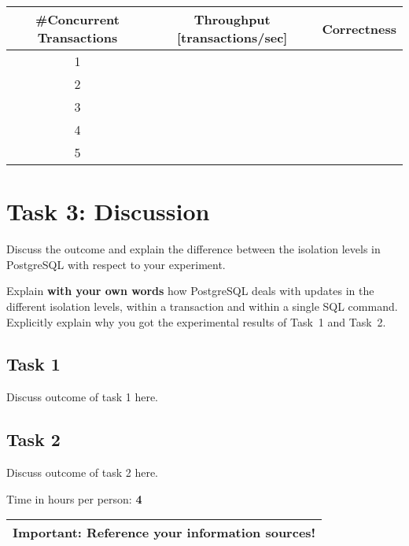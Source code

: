 \documentclass[11pt]{scrartcl}
\begin{document}
\bigskip

\begin{tabular}{c|c|c}
  \#Concurrent Transactions & Throughput [transactions/sec] & Correctness
  \\\hline
  1 & & \\
  2 & & \\
  3 & & \\
  4 & & \\
  5 & & \\    
\end{tabular}

\medskip

\section*{Task 3: Discussion}

Discuss the outcome and explain the difference between the isolation
levels in PostgreSQL with respect to your experiment.

Explain {\bf with your own words} how PostgreSQL deals with updates in
the different isolation levels, within a transaction and within a
single SQL command. Explicitly explain why you got the experimental
results of Task~1 and Task~2.

\subsection*{Task 1}

Discuss outcome of task 1 here.

\subsection*{Task 2}

Discuss outcome of task 2 here.

\bigskip

\noindent Time in hours per person: {\bf 4}

\bigskip

\begin{center}
  \begin{tabular}{c}
    \hline
    {\bf Important:} Reference your information sources!
    \\\hline
  \end{tabular}
\end{center}
\end{document}
